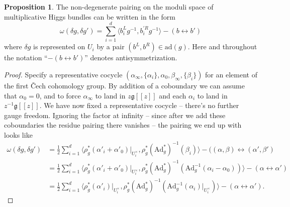 \documentclass[11pt, oneside, reqno]{amsart}
\theoremstyle{definition} \newtheorem{definition}{Definition}[section]
\newtheorem{prop}[definition]{Proposition}
\theoremstyle{definition} \newtheorem{remark}[definition]{Remark}
\theoremstyle{definition} \newtheorem{remarks}[definition]{Remarks}
\theoremstyle{definition} \newtheorem{question}[definition]{Question}
\theoremstyle{definition} \newtheorem*{note}{Note}
\theoremstyle{definition} \newtheorem{example}[definition]{Example}
\theoremstyle{definition} \newtheorem{examples}[definition]{Examples}
\renewcommand{\gg}{\mathfrak{g}}
\newcommand{\mr}[1]{\mathrm{#1}}
\newcommand{\ad}{\mr{ad}}
\newcommand{\Ad}{\mr{Ad}}
\begin{document}
\begin{prop} \label{qconn_symp_description}
The non-degenerate pairing on the moduli space of multiplicative Higgs bundles can be written in the form
\begin{equation}
\label{eq:resid}
\omega(\delta g, \delta g') = \sum_{i=1}^d \langle b_i^L g^{-1}, b^{'R}_i g^{-1} \rangle - (b \leftrightarrow b')
\end{equation}
where $\delta g$ is represented on $U_i$ by a pair $(b^L, b^R) \in \ad(g)$.  Here and throughout the notation ``$- (b \leftrightarrow b')$'' denotes antisymmetrization.
\end{prop}

\begin{proof}
 Specify a representative cocycle $(\alpha_\infty, \{\alpha_i\}, \alpha_0, \beta_\infty, \{\beta_i\})$ for an element of the first \v Cech cohomology group. By addition of a coboundary we can assume that $\alpha_0=0$, and to force $\alpha_\infty$ to land in $z\gg[[z]]$ and each $\alpha_i$ to land in $z^{-1}\gg[[z]]$.  We have now fixed a representative cocycle -- there's no further gauge freedom.  Ignoring the factor at infinity -- since after we add these coboundaries the residue pairing there vanishes -- the pairing we end up with looks like 
\begin{align*}
\omega(\delta g, \delta g') &= \frac 12 \sum_{i=1}^d \langle \rho_g^*(\alpha'_i + \alpha'_0)|_{U^\times_i},\rho_g^* (\Ad_g^*)^{-1}( \beta_i) \rangle - ((\alpha,\beta) \leftrightarrow (\alpha',\beta')\\ 
&= \frac 12 \sum_{i=1}^d \langle \rho_g^*(\alpha'_i + \alpha'_0)|_{U^\times_i}, \rho_g^*(\Ad_g^*)^{-1}(\Ad_g^{-1}(\alpha_i - \alpha_0)) \rangle - (\alpha \leftrightarrow \alpha')\\
&= \frac 12 \sum_{i=1}^d \langle \rho_g^*(\alpha'_i)|_{U^\times_i}, \rho_g^*(\Ad_g^*)^{-1}(\Ad_g^{-1}(\alpha_i)|_{U^\times_i}) \rangle - (\alpha \leftrightarrow \alpha').
\end{align*}


\end{proof}
\end{document}
